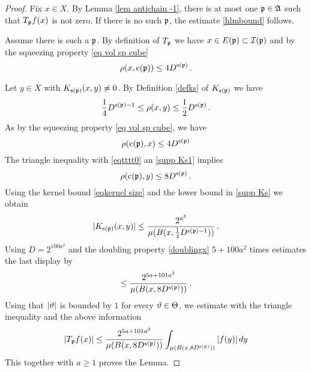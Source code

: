 \begin{proof}
Fix $x\in X$.  By Lemma \ref{lem antichain -1}, there is at most one $\mathfrak p \in \mathfrak{A}$
such that
 $T_{\mathfrak p} f(x)$ is not zero.
 If there is no such $\mathfrak p$, the estimate \eqref{hlmbound} follows.

 Assume there is such a $\mathfrak p$.
 By definition of $T_{\mathfrak p}$ we have $x\in E(\mathfrak p)\subset \mathcal{I}(\mathfrak p)$ and  by the squeezing property \eqref{eq vol sp cube}
\begin{equation}\label{eqtttt0}
    \rho(x, \mathrm{c}(\mathfrak p))\le 4D^{\mathrm{s}(\mathfrak p)}\, .
\end{equation}

Let $y\in X$ with  $K_{\mathrm{s}(\mathfrak p)}(x,y)\neq 0$. By Definition \eqref{defks} of $K_{\mathrm{s}(\mathfrak p)}$
we have
\begin{equation}\label{supp Ks1}
   \frac{1}{4} D^{\mathrm{s}(\mathfrak p)-1}
   \leq \rho(x,y) \leq \frac{1}{2} D^{\mathrm{s}(\mathfrak p)}\, .
\end{equation}
As by the squeezing property \eqref{eq vol sp cube}, we have
\begin{equation}
    \rho(\mathrm{c}(\mathfrak p),x)\le 4D^{\mathrm{s}(\mathfrak p)}
\end{equation}
The triangle inequality with \eqref{eqtttt0} an \eqref{supp Ks1} implies
\begin{equation}
    \rho(\mathrm{c}(\mathfrak p),y)\le 8D^{\mathrm{s}(\mathfrak p)}\, .
\end{equation}
Using the kernel bound \eqref{eqkernel size} and the lower bound in \eqref{supp Ks}
we obtain
\begin{equation}
|K_{\mathrm{s}(\mathfrak p)}(x,y)|\le \frac{2^{a^3}}{\mu(B(x,\frac 14 D^{{\mathrm{s}(\mathfrak p)}-1}))}\, .
\end{equation}
Using $D=2^{100a^2}$
and the doubling property \eqref{doublingx} $5 +100a^2$ times estimates
the last display by
\begin{equation}
\le \frac{2^{5a+101a^3}}{\mu(B(x,  8D^{\mathrm{s}(\mathfrak p)}))}\, .
\end{equation}
 Using that $|\vartheta|$ is bounded by $1$
 for every $\vartheta\in \Theta$, we estimate with the triangle inequality and the above information
 \begin{equation}
  | T_{\mathfrak p} f(x)|
    \le \frac{2^{5a+101 a^3}}{\mu(B(x, 8D^{\mathrm{s}(\mathfrak p)}))} \int _{\mu(B(x, 8D^{\mathrm{s}(\mathfrak p)}))} |f(y)|\, dy   \end{equation}
This together with $a\ge 1$ proves the Lemma.
\end{proof}

